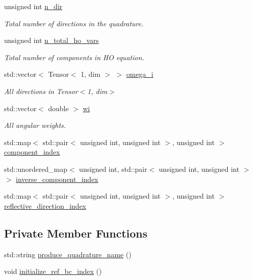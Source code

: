 \begin{DoxyCompactItemize}
unsigned int \hyperlink{class_a_q_base_a93b0c70dd1d3ec401601ceaca88723b1}{n\+\_\+dir}
\begin{DoxyCompactList}\small\item\em Total number of directions in the quadrature. \end{DoxyCompactList}\item 
unsigned int \hyperlink{class_a_q_base_a7169f8e3b53059317bb2144519f64be9}{n\+\_\+total\+\_\+ho\+\_\+vars}
\begin{DoxyCompactList}\small\item\em Total number of components in HO equation. \end{DoxyCompactList}\item 
std\+::vector$<$ Tensor$<$ 1, dim $>$ $>$ \hyperlink{class_a_q_base_a07aaf517b03be3f8405fd4063cf59231}{omega\+\_\+i}
\begin{DoxyCompactList}\small\item\em All directions in Tensor$<$1, dim$>$ \end{DoxyCompactList}\item 
std\+::vector$<$ double $>$ \hyperlink{class_a_q_base_aa43b0232837b86e608da7507bd9a14b5}{wi}
\begin{DoxyCompactList}\small\item\em All angular weights. \end{DoxyCompactList}\item 
std\+::map$<$ std\+::pair$<$ unsigned int, unsigned int $>$, unsigned int $>$ \hyperlink{class_a_q_base_a0d9e9c6302e481718d62d76c09c83d2d}{component\+\_\+index}
\item 
std\+::unordered\+\_\+map$<$ unsigned int, std\+::pair$<$ unsigned int, unsigned int $>$ $>$ \hyperlink{class_a_q_base_a657640cc73cef6130bdf5b325dd0fd11}{inverse\+\_\+component\+\_\+index}
\item 
std\+::map$<$ std\+::pair$<$ unsigned int, unsigned int $>$, unsigned int $>$ \hyperlink{class_a_q_base_a9aa6c274dd0ef167528bbec76637cc22}{reflective\+\_\+direction\+\_\+index}
\end{DoxyCompactItemize}
\subsection*{Private Member Functions}
\begin{DoxyCompactItemize}
\item 
std\+::string \hyperlink{class_a_q_base_a4ae1370033705c82d08686fd651ad6e8}{produce\+\_\+quadrature\+\_\+name} ()
\item 
void \hyperlink{class_a_q_base_aafde5b4c9ce19b1c6c4a8d37787f13b2}{initialize\+\_\+ref\+\_\+bc\+\_\+index} ()
\end{DoxyCompactItemize}
